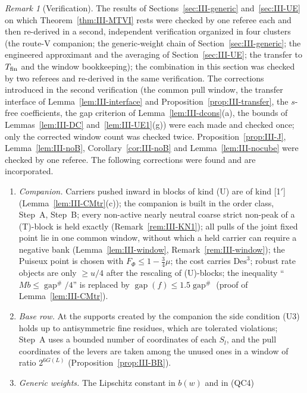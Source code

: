 \documentclass[10pt]{amsart}
\theoremstyle{definition}
\theoremstyle{remark}
\newtheorem{remark}[theorem]{Remark}
\newcommand{\gap}{\operatorname{gap}}
\begin{document}
\begin{remark}[Verification]\label{rem:III-cert}
The results of Sections~\ref{sec:III-generic} and~\ref{sec:III-UE} on which
Theorem~\ref{thm:III-MTVI} rests were checked by one referee each and then
re-derived in a second, independent verification organized in four clusters
(the route-V companion; the generic-weight chain of
Section~\ref{sec:III-generic}; the engineered approximant and the averaging
of Section~\ref{sec:III-UE}; the transfer to $T_{\rm fin}$ and the window
bookkeeping); the combination in this section was checked by two referees
and re-derived in the same verification.  The corrections introduced in the
second verification (the common pull window, the transfer interface of
Lemma~\ref{lem:III-interface} and Proposition~\ref{prop:III-transfer}, the
$s$-free coefficients, the gap criterion of Lemma~\ref{lem:III-dcons}(a), the
bounds of Lemmas~\ref{lem:III-DC} and~\ref{lem:III-UE1}(g)) were each made
and checked once; only the corrected window count was checked twice.
Proposition~\ref{prop:III-J}, Lemma~\ref{lem:III-noB},
Corollary~\ref{cor:III-noB} and Lemma~\ref{lem:III-nocube} were checked by
one referee.  The following corrections were found and are incorporated.
\begin{enumerate}
\item[(1)] \emph{Companion.}  Carriers pushed inward in blocks of kind (U) are
of kind [1$'$] (Lemma~\ref{lem:III-CMtr}(c)); the companion is built in the order class,
Step~A, Step~B; every non-active nearly neutral coarse strict non-peak of a
(T)-block is held exactly (Remark~\ref{rem:III-KN1}); all pulls of the joint
fixed point lie in one common window, without which a held carrier can
require a negative bank (Lemma~\ref{lem:III-window},
Remark~\ref{rem:III-window}); the Puiseux point is chosen with $F_\Phi\le
1-\frac34\mu$; the cost carries $\mathrm{Des}^3$; robust rate objects are only
$\ge u/4$ after the rescaling of (U)-blocks; the inequality ``$Mb\le\gap^\#/4$''
is replaced by $\gap(f)\le1.5\gap^\#$ (proof of Lemma~\ref{lem:III-CMtr}).
\item[(2)] \emph{Base row.}  At the supports created by the companion the
side condition (U3) holds up to antisymmetric fine residues, which are
tolerated violations; Step~A uses a bounded number of coordinates of each
$S_l$, and the pull coordinates of the levers are taken among the unused ones
in a window of ratio $2^{6G(L)}$ (Proposition~\ref{prop:III-BR}).
\item[(3)] \emph{Generic weights.}  The Lipschitz constant in $b(w)$ and in (QC4)

\end{enumerate}
\end{remark}
\end{document}

